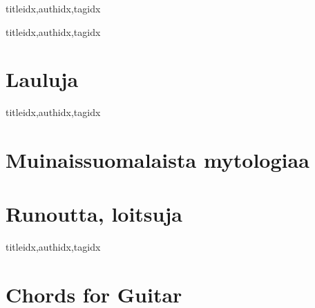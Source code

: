 \documentclass[twoside,10pt]{book}
\renewcommand{\lyricfont}{\sffamily\large} %
\begin{document}
  \clearpage\scleardpage
    \begin{songs}{titleidx,authidx,tagidx}
      \setcounter{songnum}{400}
      
    \end{songs}

  \clearpage\scleardpage
    \begin{songs}{titleidx,authidx,tagidx}
      \setcounter{songnum}{700}
      
    \end{songs} 
    
  \clearpage\scleardpage
    \begin{otherlanguage}{finnish} %
      \section{Lauluja}
        \begin{songs}{titleidx,authidx,tagidx}
          \setcounter{songnum}{800}
          
          
        \end{songs}
      \clearpage\scleardpage
      \section{Muinaissuomalaista mytologiaa}
        
      \clearpage\scleardpage
      \section{Runoutta, loitsuja}
        \begin{songs}{titleidx,authidx,tagidx}
          \setcounter{songnum}{900}
          \chordsoff %
          \renewcommand{\lyricfont}{\sffamily\small} %
          
          \renewcommand{\lyricfont}{\sffamily\large} %
          \chordson
        \end{songs}
    \end{otherlanguage}

  \clearpage\scleardpage
    \section{Chords for Guitar}
        \\
        \\
          \\
       \\
  
  \clearpage
\end{document}

